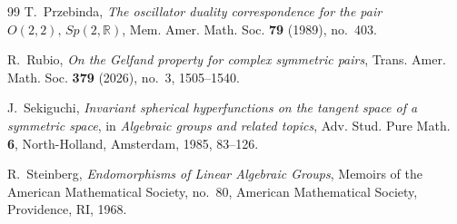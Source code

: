 \documentclass[11pt,reqno]{amsart}
\numberwithin{equation}{section}
\theoremstyle{definition}
\theoremstyle{remark}
\newcommand{\R}{\mathbb R}
\begin{document}
\begin{thebibliography}{99}
T.~Przebinda,
\emph{The oscillator duality correspondence for the pair
$O(2,2),\,Sp(2,\R)$},
Mem. Amer. Math. Soc. \textbf{79} (1989), no.~403.

R.~Rubio,
\emph{On the Gelfand property for complex symmetric pairs},
Trans. Amer. Math. Soc. \textbf{379} (2026), no.~3, 1505--1540.

J.~Sekiguchi,
\emph{Invariant spherical hyperfunctions on the tangent space of a symmetric
space},
in \emph{Algebraic groups and related topics}, Adv. Stud. Pure Math.
\textbf{6}, North-Holland, Amsterdam, 1985, 83--126.

R.~Steinberg,
\emph{Endomorphisms of Linear Algebraic Groups},
Memoirs of the American Mathematical Society, no.~80,
American Mathematical Society, Providence, RI, 1968.

\end{thebibliography}
\end{document}
